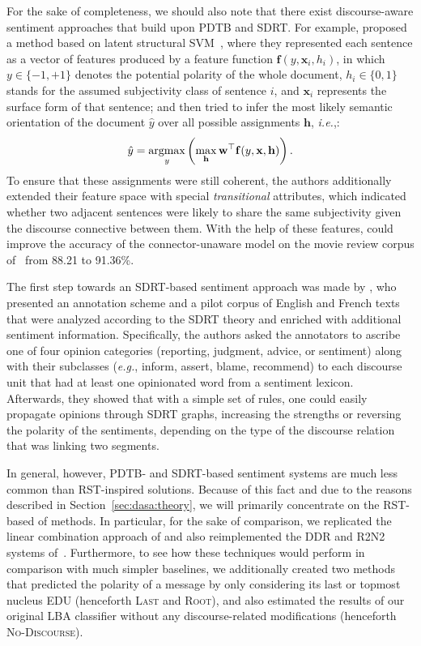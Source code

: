 \documentclass[11pt]{article}
\newcommand{\argmax}{\operatornamewithlimits{argmax}}
\newcommand{\eg}{\textit{e.g.},}
\newcommand{\ienocomma}{\textit{i.e.}}
\newcommand{\ie}{\ienocomma,}
\begin{document}
For the sake of completeness, we should also note that there exist
discourse-aware sentiment approaches that build upon PDTB and SDRT\@.
For example,  proposed a method based on latent
structural SVM~\cite{Yu:09}, where they represented each sentence as a
vector of features produced by a feature function $\mathbf{f}(y,
\mathbf{x}_i, h_i)$, in which $y\in\{-1, +1\}$ denotes the potential
polarity of the whole document, $h_i \in \{0, 1\}$ stands for the
assumed subjectivity class of sentence $i$, and $\mathbf{x}_i$
represents the surface form of that sentence; and then tried to infer
the most likely semantic orientation of the document $\hat{y}$ over
all possible assignments $\mathbf{h}$, \ie{}:
\begin{equation*}
  \hat{y} =
  \argmax_y\left(\max_{\mathbf{h}}\mathbf{w}^{\top}\mathbf{f}(y,
  \mathbf{x}, \mathbf{h})\right).
\end{equation*}
To ensure that these assignments were still coherent, the authors
additionally extended their feature space with special
\emph{transitional} attributes, which indicated whether two adjacent
sentences were likely to share the same subjectivity given the
discourse connective between them.  With the help of these features,
 could improve the accuracy of the
connector-unaware model on the movie review corpus of~
from 88.21 to 91.36\%.

The first step towards an SDRT-based sentiment approach was made by
, who presented an annotation scheme and a pilot
corpus of English and French texts that were analyzed according to the
SDRT theory and enriched with additional sentiment information.
Specifically, the authors asked the annotators to ascribe one of four
opinion categories (reporting, judgment, advice, or sentiment) along
with their subclasses (\eg{} inform, assert, blame, recommend) to each
discourse unit that had at least one opinionated word from a sentiment
lexicon.  Afterwards, they showed that with a simple set of rules, one
could easily propagate opinions through SDRT graphs, increasing the
strengths or reversing the polarity of the sentiments, depending on
the type of the discourse relation that was linking two segments.

In general, however, PDTB- and SDRT-based sentiment systems are much
less common than RST-inspired solutions.  Because of this fact and due
to the reasons described in Section~\ref{sec:dasa:theory}, we will
primarily concentrate on the RST-based of methods.  In particular, for
the sake of comparison, we replicated the linear combination approach
of  and also reimplemented the DDR and R2N2 systems
of~.  Furthermore, to see how these techniques would
perform in comparison with much simpler baselines, we additionally
created two methods that predicted the polarity of a message by only
considering its last or topmost nucleus EDU (henceforth \textsc{Last}
and \textsc{Root}), and also estimated the results of our original LBA
classifier without any discourse-related modifications (henceforth
\textsc{No-Discourse}).
\end{document}
